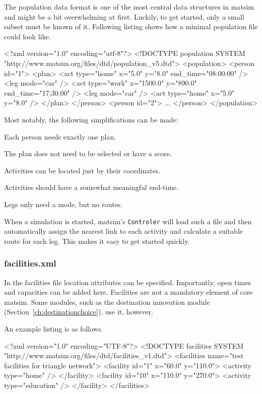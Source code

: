 The population data format is one of the most central data structures in \gls{matsim} and might be a bit overwhelming at first. Luckily, to get started, only a small subset must be known of it. Following listing shows how a minimal population file could look like. 

\begin{xml}
<?xml version="1.0" encoding="utf-8"?> 
<!DOCTYPE population SYSTEM "http://www.matsim.org/files/dtd/population_v5.dtd"> 
<population> 
   <person id="1"> 
      <plan> 
         <act type="home" x="5.0" y="8.0" end_time="08:00:00" /> 
         <leg mode="car" /> 
         <act type="work" x="1500.0" y="890.0" end_time="17:30:00" /> 
         <leg mode="car" /> 
         <act type="home" x="5.0" y="8.0" /> 
      </plan> 
   </person> 
   <person id="2"> 
      ... 
   </person> 
</population>
\end{xml}

Most notably, the following simplifications can be made:
\begin{compactitem}
\item Each person needs exactly one plan.
\item The plan does not need to be selected or have a score.
\item Activities can be located just by their coordinates.
\item Activities should have a somewhat meaningful end-time.
\item Legs only need a mode, but no routes.
\end{compactitem}
When a simulation is started, \gls{matsim}'s \lstinline|Controler| will load such a file and then automatically assign the nearest link to each activity and calculate a suitable route for each leg. This makes it easy to get started quickly. 

\subsubsection{facilities.xml}
In the facilities file location attributes can be specified. Importantly, open times and capacities can be added here. Facilities are not a mandatory element of core \gls{matsim}. Some \glspl{module}, such as the destination innovation module (Section~\ref{ch:destinationchoice}), use it, however.

An example listing is as follows.
\begin{xml}
<?xml version="1.0" encoding="UTF-8"?>
<!DOCTYPE facilities SYSTEM "http://www.matsim.org/files/dtd/facilities_v1.dtd">
<facilities name="test facilities for triangle network">
	<facility id="1" x="60.0" y="110.0">
		<activity type="home" />
	</facility>
	<facility id="10" x="110.0" y="270.0">
		<activity type="education" />
	</facility>
</facilities>
\end{xml}


